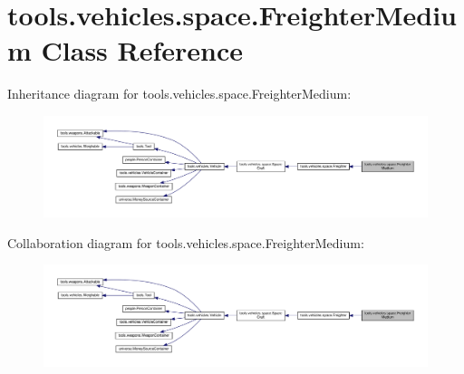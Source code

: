 \hypertarget{classtools_1_1vehicles_1_1space_1_1_freighter_medium}{}\section{tools.\+vehicles.\+space.\+Freighter\+Medium Class Reference}
\label{classtools_1_1vehicles_1_1space_1_1_freighter_medium}


Inheritance diagram for tools.\+vehicles.\+space.\+Freighter\+Medium\+:
\nopagebreak
\begin{figure}[H]
\begin{center}
\leavevmode
\includegraphics[width=350pt]{classtools_1_1vehicles_1_1space_1_1_freighter_medium__inherit__graph}
\end{center}
\end{figure}


Collaboration diagram for tools.\+vehicles.\+space.\+Freighter\+Medium\+:
\nopagebreak
\begin{figure}[H]
\begin{center}
\leavevmode
\includegraphics[width=350pt]{classtools_1_1vehicles_1_1space_1_1_freighter_medium__coll__graph}
\end{center}
\end{figure}
